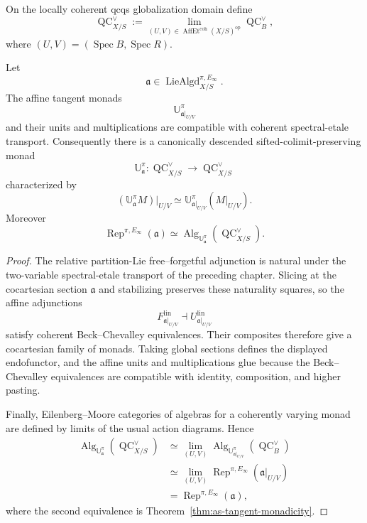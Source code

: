 \begin{definition}
\label{def:as-global-procoherent-coefficients}
On the locally coherent qcqs globalization domain define
\[
\boxed{
    \operatorname{QC}^{\vee}_{X/S}
    :=
    \lim_{(U,V)\in
    \operatorname{AffEt}^{\mathrm{coh}}(X/S)^{\mathrm{op}}}
    \operatorname{QC}^{\vee}_{B},
}
\]
where $(U,V)=(\operatorname{Spec}B,\operatorname{Spec}R)$.
\end{definition}

\begin{theorem}
\label{thm:as-global-tangent-monad}
Let
\[
    \mathfrak a
    \in
    \operatorname{LieAlgd}^{\pi,E_\infty}_{X/S}.
\]
The affine tangent monads
\[
    \mathbb U^\pi_{\mathfrak a|_{U/V}}
\]
and their units and multiplications are compatible with coherent
spectral-etale transport.  Consequently there is a canonically descended
sifted-colimit-preserving monad
\[
\boxed{
    \mathbb U^\pi_{\mathfrak a}:
    \operatorname{QC}^{\vee}_{X/S}
    \longrightarrow
    \operatorname{QC}^{\vee}_{X/S}
}
\]
characterized by
\[
    \left(
        \mathbb U^\pi_{\mathfrak a}M
    \right)|_{U/V}
    \simeq
    \mathbb U^\pi_{\mathfrak a|_{U/V}}
    \left(M|_{U/V}\right).
\]
Moreover
\[
\boxed{
    \operatorname{Rep}^{\pi,E_\infty}(\mathfrak a)
    \simeq
    \operatorname{Alg}_{\mathbb U^\pi_{\mathfrak a}}
    \left(
        \operatorname{QC}^{\vee}_{X/S}
    \right).
}
\]
\end{theorem}

\begin{proof}
The relative partition-Lie free--forgetful adjunction is natural under the
two-variable spectral-etale transport of the preceding chapter.  Slicing at
the cocartesian section $\mathfrak a$ and stabilizing preserves these
naturality squares, so the affine adjunctions
\[
F_{\mathfrak a|_{U/V}}^{\mathrm{lin}}
\dashv
U_{\mathfrak a|_{U/V}}^{\mathrm{lin}}
\]
satisfy coherent Beck--Chevalley equivalences.  Their composites therefore
give a cocartesian family of monads.  Taking global sections defines the
displayed endofunctor, and the affine units and multiplications glue because
the Beck--Chevalley equivalences are compatible with identity, composition,
and higher pasting.

Finally, Eilenberg--Moore categories of algebras for a coherently varying
monad are defined by limits of the usual action diagrams.  Hence
\[
\begin{aligned}
\operatorname{Alg}_{\mathbb U^\pi_{\mathfrak a}}
(\operatorname{QC}^{\vee}_{X/S})
&\simeq
\lim_{(U,V)}
\operatorname{Alg}_{\mathbb U^\pi_{\mathfrak a|_{U/V}}}
(\operatorname{QC}^{\vee}_B)\\
&\simeq
\lim_{(U,V)}
\operatorname{Rep}^{\pi,E_\infty}
(\mathfrak a|_{U/V})\\
&=
\operatorname{Rep}^{\pi,E_\infty}(\mathfrak a),
\end{aligned}
\]
where the second equivalence is
Theorem~\ref{thm:as-tangent-monadicity}.
\end{proof}


